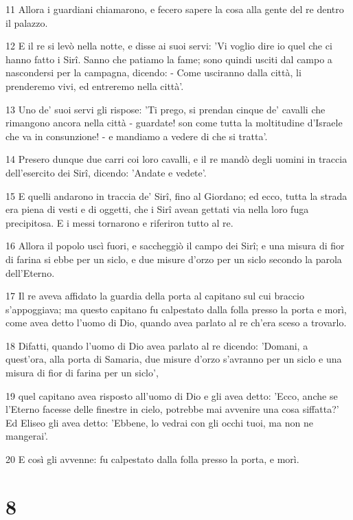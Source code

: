 \par 11 Allora i guardiani chiamarono, e fecero sapere la cosa alla gente del re dentro il palazzo.
\par 12 E il re si levò nella notte, e disse ai suoi servi: 'Vi voglio dire io quel che ci hanno fatto i Sirî. Sanno che patiamo la fame; sono quindi usciti dal campo a nascondersi per la campagna, dicendo: - Come usciranno dalla città, li prenderemo vivi, ed entreremo nella città'.
\par 13 Uno de' suoi servi gli rispose: 'Ti prego, si prendan cinque de' cavalli che rimangono ancora nella città - guardate! son come tutta la moltitudine d'Israele che va in consunzione! - e mandiamo a vedere di che si tratta'.
\par 14 Presero dunque due carri coi loro cavalli, e il re mandò degli uomini in traccia dell'esercito dei Sirî, dicendo: 'Andate e vedete'.
\par 15 E quelli andarono in traccia de' Sirî, fino al Giordano; ed ecco, tutta la strada era piena di vesti e di oggetti, che i Sirî avean gettati via nella loro fuga precipitosa. E i messi tornarono e riferiron tutto al re.
\par 16 Allora il popolo uscì fuori, e saccheggiò il campo dei Sirî; e una misura di fior di farina si ebbe per un siclo, e due misure d'orzo per un siclo secondo la parola dell'Eterno.
\par 17 Il re aveva affidato la guardia della porta al capitano sul cui braccio s'appoggiava; ma questo capitano fu calpestato dalla folla presso la porta e morì, come avea detto l'uomo di Dio, quando avea parlato al re ch'era sceso a trovarlo.
\par 18 Difatti, quando l'uomo di Dio avea parlato al re dicendo: 'Domani, a quest'ora, alla porta di Samaria, due misure d'orzo s'avranno per un siclo e una misura di fior di farina per un siclo',
\par 19 quel capitano avea risposto all'uomo di Dio e gli avea detto: 'Ecco, anche se l'Eterno facesse delle finestre in cielo, potrebbe mai avvenire una cosa siffatta?' Ed Eliseo gli avea detto: 'Ebbene, lo vedrai con gli occhi tuoi, ma non ne mangerai'.
\par 20 E così gli avvenne: fu calpestato dalla folla presso la porta, e morì.

\chapter{8}

